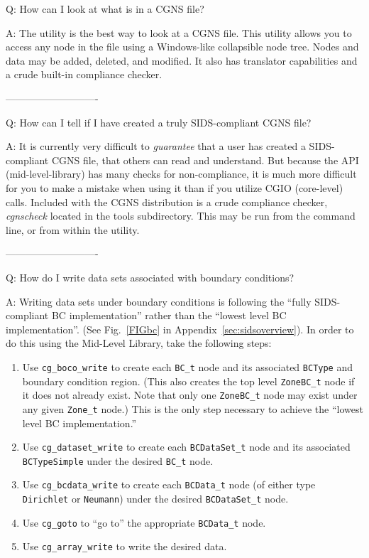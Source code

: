 \documentclass[12pt]{article}
\begin{document}
Q:  How can I look at what is in a CGNS file?

A:  The utility  is the best way to look at a CGNS
file.  This utility allows you to access any node in the file using
a Windows-like collapsible node tree. Nodes and data may be added,
deleted, and modified.
It also has translator capabilities and a crude built-in compliance checker.

----------------------------

Q:  How can I tell if I have created a truly SIDS-compliant CGNS file?

A:  It is currently very difficult to {\it guarantee} that a user has created
a SIDS-compliant CGNS file, that others can read and understand.  But because
the API (mid-level-library) has many checks for non-compliance, it is
much more difficult for you to make a mistake when using it
than if you utilize CGIO (core-level) calls.
Included with
the CGNS distribution is a crude compliance checker, {\it cgnscheck}
located in the tools subdirectory. This may be run from the command line,
or from within the  utility.

----------------------------

Q:  How do I write data sets associated with boundary conditions?

A:  Writing data sets under boundary conditions is following the
    ``fully SIDS-compliant BC implementation'' rather than the ``lowest
    level BC implementation''.
    (See Fig.~\ref{FIGbc} in Appendix~\ref{sec:sidsoverview}).
    In order to do this using the Mid-Level Library, take the following
    steps:
    \begin{enumerate}
    \item Use \texttt{cg\_boco\_write} to create each \texttt{BC\_t}
          node and its associated \texttt{BCType} and boundary condition region.
          (This also creates the top level \texttt{ZoneBC\_t} node if it
          does not already exist.
          Note that only one \texttt{ZoneBC\_t} node may exist under any
          given \texttt{Zone\_t} node.)
          This is the only step necessary to achieve the ``lowest level
          BC implementation.''
    \item Use \texttt{cg\_dataset\_write} to create each
          \texttt{BCDataSet\_t} node and its associated
          \texttt{BCTypeSimple} under the desired \texttt{BC\_t} node.
    \item Use \texttt{cg\_bcdata\_write} to create each
          \texttt{BCData\_t} node (of either type \texttt{Dirichlet}
          or \texttt{Neumann}) under the desired \texttt{BCDataSet\_t}
          node.
    \item Use \texttt{cg\_goto} to ``go to'' the appropriate
          \texttt{BCData\_t} node.
    \item Use \texttt{cg\_array\_write} to write the desired data.
    \end{enumerate}
\end{document}
